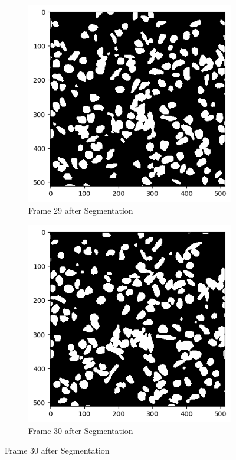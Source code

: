 \documentclass{article}
\begin{document}
\begin{figure}[h!]
  \begin{subfigure}{0.4\textwidth}
    \includegraphics[width=\linewidth]{Report/Appendix_Images/Segmentation-B-Growth/frame_29.png}
    \caption*{Frame 29 after Segmentation}
  \end{subfigure}
  \hfill
  \begin{subfigure}{0.4\textwidth}
    \includegraphics[width=\linewidth]{Report/Appendix_Images/Segmentation-B-Growth/frame_30.png}
    \caption*{Frame 30 after Segmentation}
  \end{subfigure}
\end{figure}
\clearpage
\end{document}
